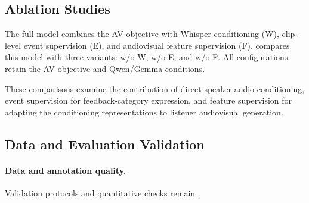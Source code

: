 \subsection{Ablation Studies}
\label{sec:ablation}

The full model combines the AV objective with Whisper
conditioning (W), clip-level event supervision (E),
and audiovisual feature supervision (F).
 compares this model with three
variants: w/o W, w/o E, and w/o F. All configurations
retain the AV objective and Qwen/Gemma conditions.

These comparisons examine the contribution of direct
speaker-audio conditioning, event supervision for
feedback-category expression, and feature supervision
for adapting the conditioning representations to
listener audiovisual generation.




\subsection{Data and Evaluation Validation}
\label{sec:validation}
\paragraph{Data and annotation quality.}
Validation protocols and quantitative checks remain \pending.
% 

